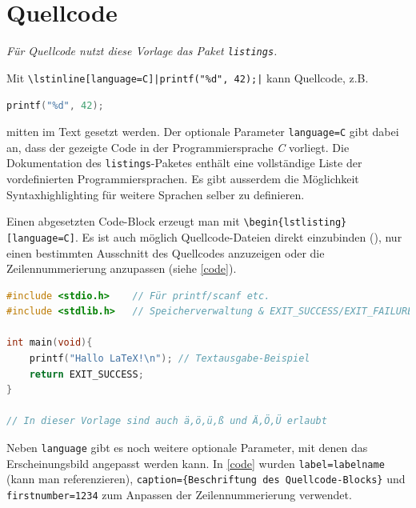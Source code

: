 		
	\section{Quellcode}
			
		\emph{Für Quellcode nutzt diese Vorlage das Paket \lstinline|listings|.}
		\medskip
		
		Mit \lstinline{\lstinline[language=C]|printf("%d", 42);|} kann Quellcode, z.B. \begin{vorlagenbeispiel}
		\lstinline[language=C]|printf("%d", 42);|
		\end{vorlagenbeispiel} mitten im Text gesetzt werden.
		Der optionale Parameter \lstinline[language=thesis-latexbeispiel]|language=C| gibt dabei an, dass der gezeigte Code in der Programmiersprache \emph{C} vorliegt.
%		
		Die Dokumentation des \lstinline[language=thesis-latexbeispiel]|listings|-Paketes enthält eine vollständige Liste der vordefinierten Programmiersprachen.
		Es gibt ausserdem die Möglichkeit Syntaxhighlighting für weitere Sprachen selber zu definieren.
		\bigskip
		
		Einen abgesetzten Code-Block erzeugt man mit \lstinline[language=thesis-latexbeispiel]|\begin{lstlisting}[language=C]|. Es ist auch möglich Quellcode-Dateien direkt einzubinden (\lstinline[language=thesis-latexbeispiel]||), nur einen bestimmten Ausschnitt des Quellcodes anzuzeigen oder die Zeilennummerierung anzupassen (siehe \autoref{code}).
		
		\begin{vorlagenbeispiel}
			\begin{lstlisting}[label=code, language=C, caption={Hello World-Beispiel im lstlisting-Beispiel},firstnumber=1234, emph={printf, schokostuecke}] 
#include <stdio.h>    // Für printf/scanf etc.
#include <stdlib.h>   // Speicherverwaltung & EXIT_SUCCESS/EXIT_FAILURE-Makros

int main(void){
	printf("Hallo LaTeX!\n"); // Textausgabe-Beispiel
	return EXIT_SUCCESS;
}

// In dieser Vorlage sind auch ä,ö,ü,ß und Ä,Ö,Ü erlaubt
			\end{lstlisting}
		\end{vorlagenbeispiel}
		
		Neben \lstinline|language| gibt es noch weitere optionale Parameter, mit denen das Erscheinungsbild angepasst werden kann.
		In \autoref{code} wurden \lstinline|label=labelname| (kann man referenzieren), \lstinline|caption={Beschriftung des Quellcode-Blocks}| und \lstinline|firstnumber=1234| zum Anpassen der Zeilennummerierung verwendet.
	
